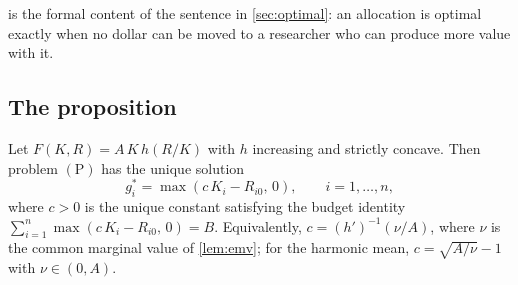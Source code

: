  is the formal content of the sentence in \cref{sec:optimal}: an allocation is optimal exactly when no dollar can be moved to a researcher who can produce more value with it.

\subsection*{The proposition}

\begin{proprestate}
Let $F(K, R) = A\,K\,h(R/K)$ with $h$ increasing and strictly concave. Then problem $(\mathrm{P})$ has the unique solution
\[
g_i^* = \max(c\,K_i - R_{i0},\, 0), \qquad i = 1, \ldots, n,
\]
where $c > 0$ is the unique constant satisfying the budget identity $\sum_{i=1}^n \max(c\,K_i - R_{i0},\, 0) = B$. Equivalently, $c = (h')^{-1}(\nu/A)$, where $\nu$ is the common marginal value of \cref{lem:emv}; for the harmonic mean, $c = \sqrt{A/\nu} - 1$ with $\nu \in (0, A)$.
\end{proprestate}

